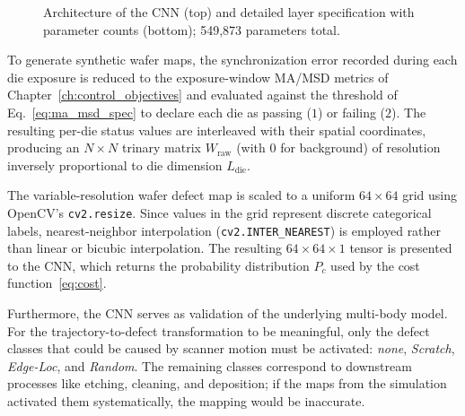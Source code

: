 \begin{figure}[htbp]
\caption{Architecture of the CNN (top) and detailed layer specification with parameter counts (bottom); 549{,}873 parameters total.}
\label{fig:wafer_cnn_architecture}
\end{figure}

To generate synthetic wafer maps, the synchronization error recorded during each die exposure is reduced to the exposure-window MA/MSD metrics of Chapter~\ref{ch:control_objectives} and evaluated against the threshold of Eq.~\eqref{eq:ma_msd_spec} to declare each die as passing ($1$) or failing ($2$). The resulting per-die status values are interleaved with their spatial coordinates, producing an $N \times N$ trinary matrix $W_{\text{raw}}$ (with $0$ for background) of resolution inversely proportional to die dimension $L_{\text{die}}$.

The variable-resolution wafer defect map is scaled to a uniform $64 \times 64$ grid using OpenCV's \texttt{cv2.resize}. Since values in the grid represent discrete categorical labels, nearest-neighbor interpolation (\texttt{cv2.INTER\_NEAREST}) is employed rather than linear or bicubic interpolation. The resulting $64 \times 64 \times 1$ tensor is presented to the CNN, which returns the probability distribution $P_c$ used by the cost function~\eqref{eq:cost}.

Furthermore, the CNN serves as validation of the underlying multi-body model. For the trajectory-to-defect transformation to be meaningful, only the defect classes that could be caused by scanner motion must be activated: \textit{none}, \textit{Scratch}, \textit{Edge-Loc}, and \textit{Random}. The remaining classes correspond to downstream processes like etching, cleaning, and deposition; if the maps from the simulation activated them systematically, the mapping would be inaccurate.
